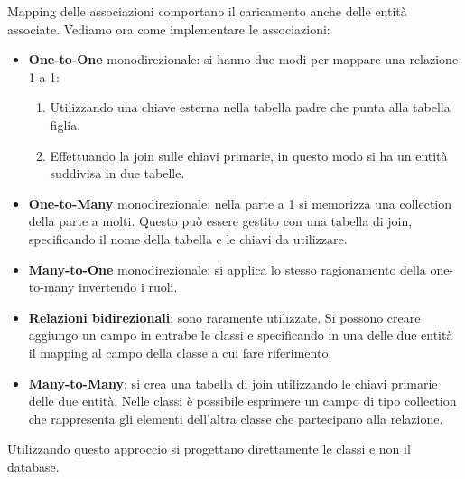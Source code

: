Mapping delle associazioni comportano il caricamento anche delle entità associate.
Vediamo ora come implementare le associazioni:
\begin{itemize}
      \item \textbf{One-to-One} monodirezionale: si hanno due modi per mappare
            una relazione 1 a 1:
            \begin{enumerate}
                  \item Utilizzando una chiave esterna nella tabella padre che punta
                        alla tabella figlia.
                  \item Effettuando la join sulle chiavi primarie, in questo modo si
                        ha un entità suddivisa in due tabelle.
            \end{enumerate}
      \item \textbf{One-to-Many} monodirezionale: nella parte a 1 si memorizza
            una collection della parte a molti. Questo può essere gestito con una
            tabella di join, specificando il nome della tabella e le chiavi da
            utilizzare.
      \item \textbf{Many-to-One} monodirezionale: si applica lo stesso ragionamento
            della one-to-many invertendo i ruoli.
      \item \textbf{Relazioni bidirezionali}: sono raramente utilizzate. Si possono
            creare aggiungo un campo in entrabe le classi e specificando in una
            delle due entità il mapping al campo della classe a cui fare riferimento.
      \item \textbf{Many-to-Many}: si crea una tabella di join utilizzando le
            chiavi primarie delle due entità. Nelle classi è possibile esprimere
            un campo di tipo collection che rappresenta gli elementi dell'altra
            classe che partecipano alla relazione.
\end{itemize}

Utilizzando questo approccio si progettano direttamente le classi e non il database.

